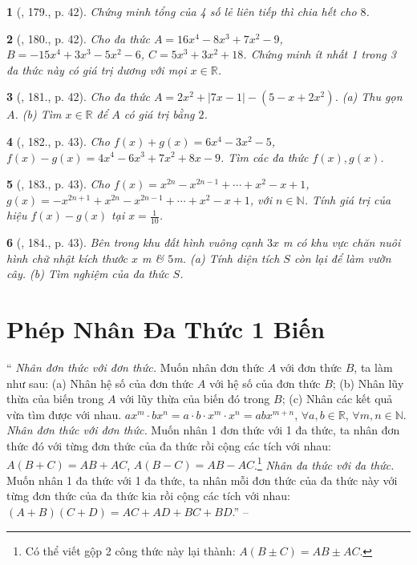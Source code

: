 \documentclass{article}
\newtheorem{baitoan}{}
\begin{document}
\begin{baitoan}[\cite{Tuyen_Toan_7}, 179., p. 42]
	Chứng minh tổng của 4 số lẻ liên tiếp thì chia hết cho $8$.
\end{baitoan}

\begin{baitoan}[\cite{Tuyen_Toan_7}, 180., p. 42]
	Cho đa thức $A = 16x^4 - 8x^3 + 7x^2 - 9$, $B = -15x^4 + 3x^3 - 5x^2 - 6$, $C = 5x^3 + 3x^2 + 18$. Chứng minh ít nhất 1 trong 3 đa thức này có giá trị dương với mọi $x\in\mathbb{R}$.
\end{baitoan}

\begin{baitoan}[\cite{Tuyen_Toan_7}, 181., p. 42]
	Cho đa thức $A = 2x^2 + |7x - 1| - (5 - x + 2x^2)$. (a) Thu gọn $A$. (b) Tìm $x\in\mathbb{R}$ để $A$ có giá trị bằng $2$.
\end{baitoan}

\begin{baitoan}[\cite{Tuyen_Toan_7}, 182., p. 43]
	Cho $f(x) + g(x) = 6x^4 - 3x^2 - 5$, $f(x) - g(x) = 4x^4 - 6x^3 + 7x^2 + 8x - 9$. Tìm các đa thức $f(x),g(x)$.
\end{baitoan}

\begin{baitoan}[\cite{Tuyen_Toan_7}, 183., p. 43]
	Cho $f(x) = x^{2n} - x^{2n-1} + \cdots + x^2 - x + 1$, $g(x) = -x^{2n+1} + x^{2n} - x^{2n-1} + \cdots + x^2 - x + 1$, với $n\in\mathbb{N}$. Tính giá trị của hiệu $f(x) - g(x)$ tại $x = \frac{1}{10}$.
\end{baitoan}

\begin{baitoan}[\cite{Tuyen_Toan_7}, 184., p. 43]
	Bên trong khu đất hình vuông cạnh $3x$ \emph{m} có khu vực chăn nuôi hình chữ nhật kích thước $x$ \emph{m} \& $5$\emph{m}. (a) Tính diện tích $S$ còn lại để làm vườn cây. (b) Tìm nghiệm của đa thức $S$.
\end{baitoan}


\section{Phép Nhân Đa Thức 1 Biến}
`` \textit{Nhân đơn thức với đơn thức.} Muốn nhân đơn thức $A$ với đơn thức $B$, ta làm như sau: (a) Nhân hệ số của đơn thức $A$ với hệ số của đơn thức $B$; (b) Nhân lũy thừa của biến trong $A$ với lũy thừa của biến đó trong $B$; (c) Nhân các kết quả vừa tìm được với nhau. $ax^m\cdot bx^n = a\cdot b\cdot x^m\cdot x^n = abx^{m+n}$, $\forall a,b\in\mathbb{R}$, $\forall m,n\in\mathbb{N}$.  \textit{Nhân đơn thức với đơn thức.} Muốn nhân 1 đơn thức với 1 đa thức, ta nhân đơn thức đó với từng đơn thức của đa thức rồi cộng các tích với nhau: $A(B + C) = AB + AC$, $A(B - C) = AB - AC$.\footnote{Có thể viết gộp 2 công thức này lại thành: $A(B\pm C) = AB\pm AC$.}  \textit{Nhân đa thức với đa thức.} Muốn nhân 1 đa thức với 1 đa thức, ta nhân mỗi đơn thức của đa thức này với từng đơn thức của đa thức kia rồi cộng các tích với nhau: $(A + B)(C + D) = AC + AD + BC + BD$.'' -- \cite[Chap. VI, \S4, pp. 47--48]{SBT_Toan_7_Canh_Dieu_tap_2}
\end{document}
